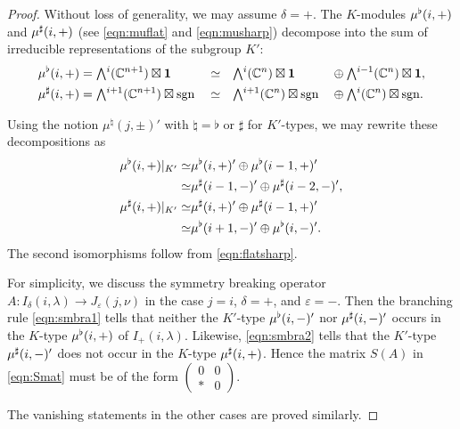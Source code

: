 \begin{proof}
Without loss of generality,
 we may assume $\delta=+$.  
The $K$-modules $\mu^{\flat}(i,+)$ and $\mu^{\sharp}(i,+)$
 (see \eqref{eqn:muflat} and \eqref{eqn:musharp})
 decompose into the sum of irreducible representations
 of the subgroup $K'$:
\begin{alignat*}{4}
 \mub(i,+) &= \Exterior^{i}({\mathbb{C}}^{n+1}) \boxtimes {\bf{1}}
&&\simeq
&& \Exterior^{i}({\mathbb{C}}^{n}) \boxtimes {\bf{1}}
&&    \oplus 
 \Exterior^{i-1}({\mathbb{C}}^{n}) \boxtimes {\bf{1}}, 
\\
 \mus(i,+) &= \Exterior^{i+1}({\mathbb{C}}^{n+1}) \boxtimes {\operatorname{sgn}}
&&\simeq
&& \Exterior^{i+1}({\mathbb{C}}^{n}) \boxtimes {\operatorname{sgn}}
&&    \oplus
    \Exterior^{i}({\mathbb{C}}^{n}) \boxtimes {\operatorname{sgn}}.  
\end{alignat*}

Using the notion $\mu^{\natural}(j,\pm)'$
 with $\natural=\flat$ or $\sharp$
 for $K'$-types,
 we may rewrite these decompositions as
\begin{align}
\mu^{\flat}(i,+)|_{K'}
\simeq & \mu^{\flat}(i,+)' \oplus \mu^{\flat}(i-1,+)'
\label{eqn:smbra1}
\\
\simeq & \mu^{\sharp}(i-1,-)' \oplus \mu^{\sharp}(i-2,-)', 
\notag
\\
\mu^{\sharp}(i,+)|_{K'}
\simeq & \mu^{\sharp}(i,+)' \oplus \mu^{\sharp}(i-1,+)'
\label{eqn:smbra2}
\\
\simeq & \mu^{\flat}(i+1,-)' \oplus \mu^{\flat}(i,-)'.  
\notag
\end{align}
The second isomorphisms follow from \eqref{eqn:flatsharp}.  



For simplicity,
 we discuss the symmetry breaking operator
 $A\colon I_{\delta}(i,\lambda) \to J_{\varepsilon}(j,\nu)$
 in the case $j=i$, $\delta=+$, and $\varepsilon=-$.  
Then the branching rule \eqref{eqn:smbra1} tells
 that neither the $K'$-type $\mu^{\flat} (i,-)'$ nor $\mu^{\sharp}(i,-)'$
 occurs in the $K$-type $\mu^{\flat} (i,+)$ of $I_+(i,\lambda)$.  
Likewise, 
 \eqref{eqn:smbra2} tells
 that the $K'$-type $\mu^{\sharp}(i,-)'$
 does not occur in the $K$-type $\mu^{\sharp} (i,+)$.  
Hence the matrix $S(A)$ in \eqref{eqn:Smat} must be of the form
 $\begin{pmatrix} 0 & 0 \\ \ast & 0\end{pmatrix}$.  



The vanishing statements in the other cases are proved similarly.  
\end{proof}


